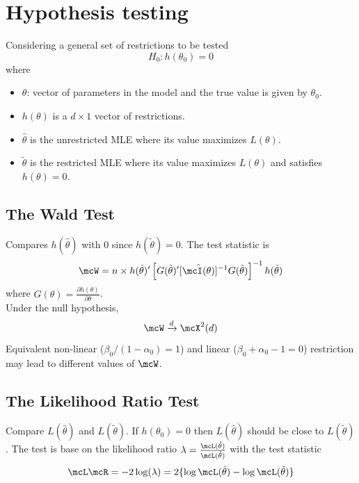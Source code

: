 \section{Hypothesis testing}
Considering a general set of restrictions to be tested
\begin{equation}
    H_0 : h(\theta_0) = 0
\end{equation}
where 
\begin{itemize}
    \item $\theta$: vector of parameters in the model and the true value is given by $\theta_0$.
    \item $h(\theta)$ is a $d\times 1$ vector of restrictions.
    \item $\hat{\theta}$ is the unrestricted MLE where its value maximizes $L(\theta)$.
    \item $\tilde{\theta}$ is the restricted MLE where its value maximizes $L(\theta)$ and satisfies $h(\theta) = 0$.
\end{itemize}

\subsection{The Wald Test}
Compares $h(\hat{\theta})$ with $0$ since $h(\tilde{\theta}) = 0$.
The test statistic is
\begin{equation}
    \mcW = n\times h(\hat{\theta})'\left[G(\hat{\theta})'[\hat{\mcI(\theta)}]^{-1}G(\hat{\theta})\right]^{-1}h(\hat{\theta})
\end{equation}
where $G(\theta) = \frac{\partial h(\theta)}{\partial\theta}$.\\

Under the null hypothesis,
\begin{equation}
    \mcW \xrightarrow{d} \mcX^2(d)
\end{equation}
Equivalent non-linear ($\beta_0/(1-\alpha_0)=1$) and linear ($\beta_0+\alpha_0-1 = 0$) restriction may lead to different values of $\mcW$.

\subsection{The Likelihood Ratio Test}
Compare $L(\hat{\theta})$ and $L(\tilde{\theta})$. 
If $h(\theta_0) = 0$ then $L(\hat{\theta})$ should be close to $L(\tilde{\theta})$.
The test is base on the likelihood ratio $\lambda = \frac{\mcL(\tilde{\theta})}{\mcL(\hat{\theta})}$ with the test statistic 
\begin{equation}
    \mcL\mcR = -2\log(\lambda) = 2\{\log\mcL(\hat{\theta}) - \log\mcL(\tilde{\theta})\}
\end{equation}
\\

